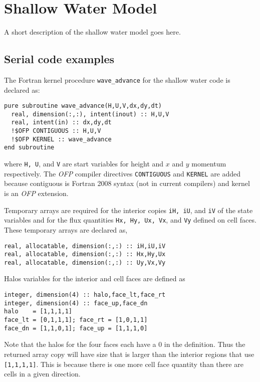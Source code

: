 \section{Shallow Water Model}

A short description of the shallow water model goes here.

\subsection{Serial code examples}

The Fortran kernel procedure {\tt wave\_advance} for the shallow water code
is declared as:

{\small
\begin{verbatim}
pure subroutine wave_advance(H,U,V,dx,dy,dt)
  real, dimension(:,:), intent(inout) :: H,U,V
  real, intent(in) :: dx,dy,dt
  !$OFP CONTIGUOUS :: H,U,V
  !$OFP KERNEL :: wave_advance
end subroutine
\end{verbatim}
}

where {\tt H, U}, and {\tt V} are start variables for height and
$x$ and $y$ momentum respectively.  The \emph{OFP} compiler directives
{\tt CONTIGUOUS} and {\tt KERNEL} are added because contiguous is Fortran
2008 syntax (not in current compilers) and kernel is an \emph{OFP} extension.

Temporary arrays are required for the interior copies {\tt iH, iU}, and
{\tt iV} of the state variables and for the flux quantities {\tt Hx, Hy, Ux,
Vx}, and {\tt Vy} defined on cell faces.  These temporary arrays are declared as,

{\small
\begin{verbatim}
real, allocatable, dimension(:,:) :: iH,iU,iV
real, allocatable, dimension(:,:) :: Hx,Hy,Ux
real, allocatable, dimension(:,:) :: Uy,Vx,Vy
\end{verbatim}
}

Halos variables for the interior and cell faces are defined as

{\small
\begin{verbatim}
integer, dimension(4) :: halo,face_lt,face_rt
integer, dimension(4) :: face_up,face_dn
halo    = [1,1,1,1]
face_lt = [0,1,1,1]; face_rt = [1,0,1,1]
face_dn = [1,1,0,1]; face_up = [1,1,1,0]
\end{verbatim}
}

Note that the halos for the four faces each have a 0 in the
definition. Thus the returned array copy will have size that is larger
than the interior regions that use {\tt [1,1,1,1]}.  This is because
there is one more cell face quantity than there are cells in a given
direction.

